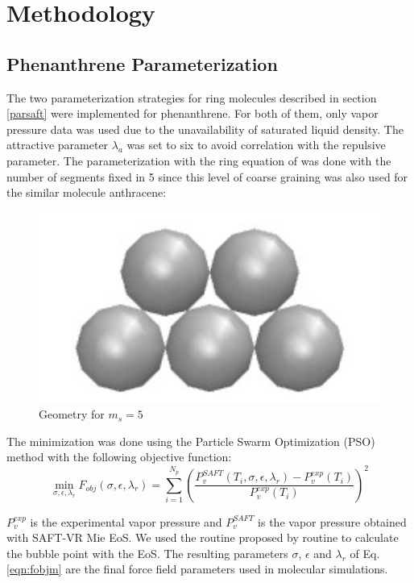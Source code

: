 \chapter{Methodology} %

\label{Chapter4} %

\section{Phenanthrene Parameterization}\label{parame}

The two parameterization strategies for ring molecules described in section \ref{parsaft} were implemented for phenanthrene. For both of them, only vapor pressure data \cite{pvphen} was used due to the unavailability of saturated liquid density. The attractive parameter $\lambda _{a}$ was set to six to avoid correlation with the repulsive parameter. The parameterization with the ring equation of  was done with the number of segments fixed in 5 since this level of coarse graining was also used for the similar molecule anthracene:
\begin{figure}[th]
	\centering
	\includegraphics[width=0.25\linewidth]{Figures/fen5}
	\caption{Geometry for $m_{s}=5$}
	\label{fig:fen5}
\end{figure}

The minimization was done using the Particle Swarm Optimization (PSO) method with the following objective function:
\begin{equation}
\min\limits_{\sigma,\epsilon,\lambda_{r}} F_{obj}(\sigma,\epsilon,\lambda_{r})= \sum_{i=1}^{N_{p}} \left(\frac{P_{v}^{SAFT}(T_{i},\sigma,\epsilon,\lambda_{r})-P_{v}^{exp}(T_{i})}{P_{v}^{exp}(T_{i})} \right)^2
\label{eqn:fobjm}
\end{equation}

$P_{v}^{exp}$ is the experimental vapor pressure and $P_{v}^{SAFT}$ is the vapor pressure obtained with SAFT-VR Mie EoS. We used the routine proposed by   routine to calculate the bubble point with the EoS. The resulting  parameters $\sigma$, $\epsilon $ and $\lambda _{r}$ of Eq. \eqref{eqn:fobjm} are the final force field parameters used in molecular simulations. 

